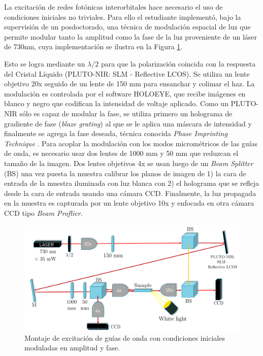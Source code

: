 \documentclass{article}
\begin{document}
La excitación de redes fotónicas interorbitales hace necesario el uso de condiciones iniciales no triviales. Para ello el estudiante implementó, bajo la supervisión de un posdoctorado, una técnica de modulación espacial de luz que permite modular tanto la amplitud como la fase de la luz proveniente de un láser de 730nm, cuya implementación se ilustra en la Figura \ref{fig:SLM}. 

Esto se logra mediante un $\lambda/2$ para que la polarización coincida con la respuesta del Cristal Líquido (PLUTO-NIR: SLM - Reflective LCOS). Se utiliza un lente objetivo 20x seguido de un lente de 150 mm para ensanchar y colimar el haz. La modulación es controlada por el software HOLOEYE, que recibe imágenes en blanco y negro que codifican la intensidad de voltaje aplicado. Como un PLUTO-NIR sólo es capaz de modular la fase, se utiliza primero un holograma de gradiente de fase (\textit{blaze grating}) al que se le aplica una máscara de intensidad y finalmente se agrega la fase deseada, técnica conocida \textit{Phase Imprinting Technique} \cite{slm}. Para acoplar la modulación con los modos micrométricos de las guías de onda, es necesario usar dos lentes de 1000 mm y 50 mm que reduzcan el tamaño de la imagen. Dos lentes objetivos 4x se usan luego de un \textit{Beam Splitter} (BS) una vez puesta la muestra calibrar los planos de imagen de 1) la cara de entrada de la muestra iluminada con luz blanca con 2) el holograma que se refleja desde la cara de entrada usando una cámara CCD. Finalmente, la luz propagada en la muestra es capturada por un lente objetivo 10x y enfocada en otra cámara CCD tipo \textit{Beam Proflier}.

\begin{figure}[H]
	\centering
	\includegraphics[width=0.8\linewidth]{./media/SLMsetup.png}
	\caption{Montaje de excitación de guías de onda con condiciones iniciales moduladas en amplitud y fase.\label{fig:SLM}}
\end{figure}
\end{document}
